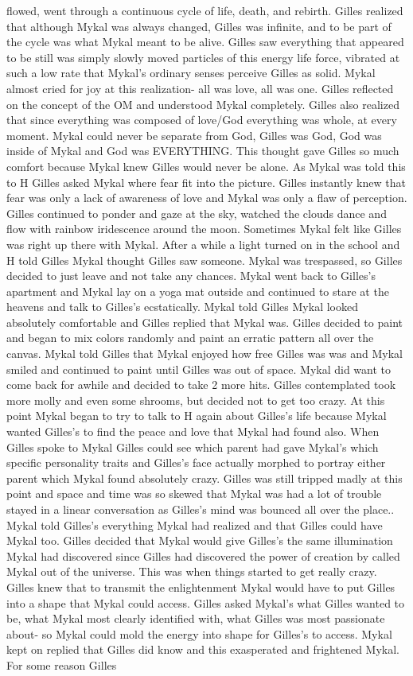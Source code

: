 \documentclass[12pt]{book}
\begin{document}
flowed, went through a continuous cycle of life, death, and rebirth. Gilles realized that although Mykal was always changed, Gilles was infinite, and to be part of the cycle was what Mykal meant to be alive. Gilles saw everything that appeared to be still was simply slowly moved particles of this energy life force, vibrated at such a low rate that Mykal's ordinary senses perceive Gilles as solid. Mykal almost cried for joy at this realization- all was love, all was one. Gilles reflected on the concept of the OM and understood Mykal completely. Gilles also realized that since everything was composed of love/God everything was whole, at every moment. Mykal could never be separate from God, Gilles was God, God was inside of Mykal and God was EVERYTHING. This thought gave Gilles so much comfort because Mykal knew Gilles would never be alone. As Mykal was told this to H Gilles asked Mykal where fear fit into the picture. Gilles instantly knew that fear was only a lack of awareness of love and Mykal was only a flaw of perception. Gilles continued to ponder and gaze at the sky, watched the clouds dance and flow with rainbow iridescence around the moon. Sometimes Mykal felt like Gilles was right up there with Mykal. After a while a light turned on in the school and H told Gilles Mykal thought Gilles saw someone. Mykal was trespassed, so Gilles decided to just leave and not take any chances. Mykal went back to Gilles's apartment and Mykal lay on a yoga mat outside and continued to stare at the heavens and talk to Gilles's ecstatically. Mykal told Gilles Mykal looked absolutely comfortable and Gilles replied that Mykal was. Gilles decided to paint and began to mix colors randomly and paint an erratic pattern all over the canvas. Mykal told Gilles that Mykal enjoyed how free Gilles was was and Mykal smiled and continued to paint until Gilles was out of space. Mykal did want to come back for awhile and decided to take 2 more hits. Gilles contemplated took more molly and even some shrooms, but decided not to get too crazy. At this point Mykal began to try to talk to H again about Gilles's life because Mykal wanted Gilles's to find the peace and love that Mykal had found also. When Gilles spoke to Mykal Gilles could see which parent had gave Mykal's which specific personality traits and Gilles's face actually morphed to portray either parent which Mykal found absolutely crazy. Gilles was still tripped madly at this point and space and time was so skewed that Mykal was had a lot of trouble stayed in a linear conversation as Gilles's mind was bounced all over the place.. Mykal told Gilles's everything Mykal had realized and that Gilles could have Mykal too. Gilles decided that Mykal would give Gilles's the same illumination Mykal had discovered since Gilles had discovered the power of creation by called Mykal out of the universe. This was when things started to get really crazy. Gilles knew that to transmit the enlightenment Mykal would have to put Gilles into a shape that Mykal could access. Gilles asked Mykal's what Gilles wanted to be, what Mykal most clearly identified with, what Gilles was most passionate about- so Mykal could mold the energy into shape for Gilles's to access. Mykal kept on replied that Gilles did know and this exasperated and frightened Mykal. For some reason Gilles 
\end{document}

